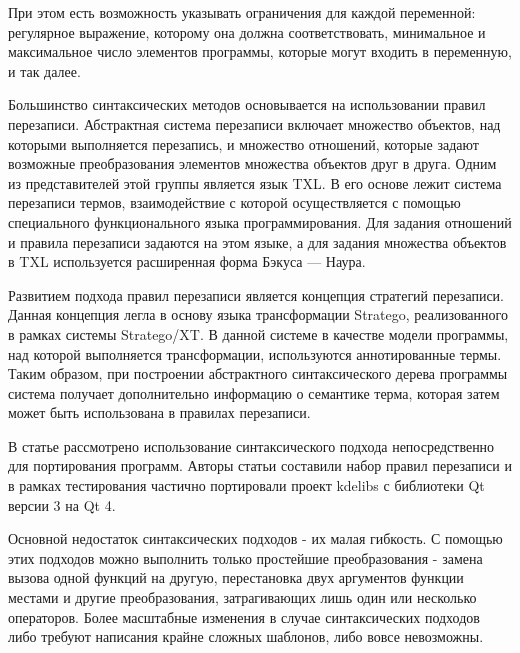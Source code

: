 При этом есть возможность указывать ограничения для каждой переменной: регулярное выражение, которому она должна соответствовать, минимальное и максимальное число элементов программы, которые могут входить в переменную, и так далее.

Большинство синтаксических методов основывается на использовании правил перезаписи. Абстрактная система перезаписи включает множество объектов, над которыми выполняется перезапись, и множество отношений, которые задают возможные преобразования элементов множества объектов друг в друга. Одним из представителей этой группы является язык TXL\cite{cordy2006txl}. В его основе лежит система перезаписи термов, взаимодействие с которой осуществляется с помощью специального функционального языка программирования. Для задания отношений и правила перезаписи задаются на этом языке, а для задания множества объектов в TXL используется расширенная форма Бэкуса — Наура.

Развитием подхода правил перезаписи является концепция стратегий перезаписи. Данная концепция легла в основу языка трансформации Stratego, реализованного в рамках системы Stratego/XT\cite{bravenboer2008stratego}. В данной системе в качестве модели программы, над которой выполняется трансформации, используются аннотированные термы. Таким образом, при построении абстрактного синтаксического дерева программы система получает дополнительно информацию о семантике терма, которая затем может быть использована в правилах перезаписи.

В статье \cite{broeksema2011visual} рассмотрено использование синтаксического подхода непосредственно для портирования программ. Авторы статьи составили набор правил перезаписи и в рамках тестирования частично портировали проект kdelibs с библиотеки Qt версии 3 на Qt 4.

Основной недостаток синтаксических подходов - их малая гибкость. С помощью этих подходов можно выполнить только простейшие преобразования - замена вызова одной функций на другую, перестановка двух аргументов функции местами и другие преобразования, затрагивающих лишь один или несколько операторов. Более масштабные изменения в случае синтаксических подходов либо требуют написания крайне сложных шаблонов, либо вовсе невозможны.

